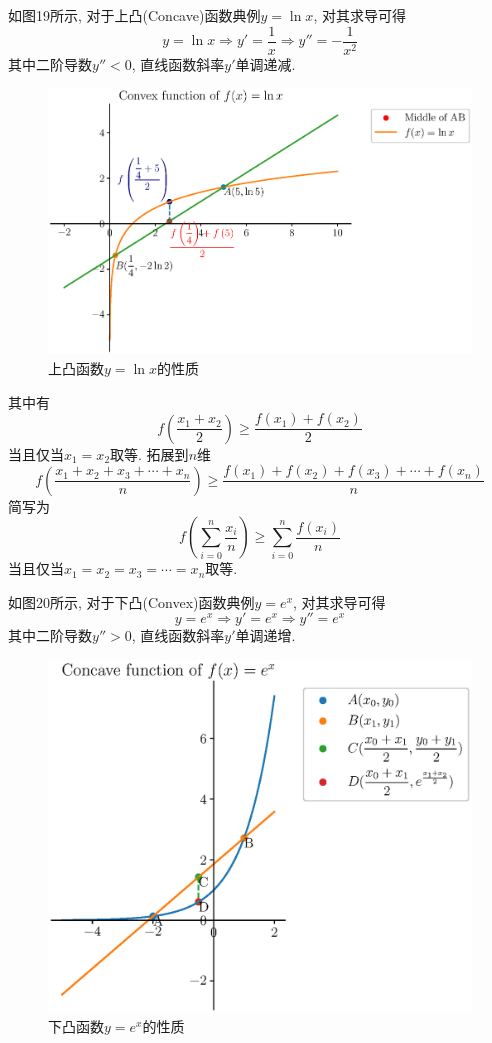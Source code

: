 \documentclass{book}
\begin{document}
    如图19所示, 对于上凸(Concave)函数典例$y=\ln x$, 对其求导可得$$y=\ln x\Longrightarrow y'=\frac{1}{x}\Longrightarrow y''=-\frac{1}{x^2}$$其中二阶导数$y''<0$, 直线函数斜率$y'$单调递减.

    \begin{figure}[htbp]
        \centering
        \includegraphics[width=\textwidth]{img/ConvexFunctionIntro.eps}
        \caption{上凸函数$\displaystyle y=\ln x$的性质}
    \end{figure}

    其中有$$f\left( \frac{x_1+x_2}{2} \right)\ge \frac{f\left( x_1 \right)+f\left( x_2 \right)}{2}$$当且仅当$x_1=x_2$取等. 拓展到$n$维$$f\left( \frac{x_1+x_2+x_3+\cdots+x_n}{n} \right)\ge \frac{f(x_1)+f(x_2)+f(x_3)+\cdots+f(x_n)}{n}$$简写为$$f\left( \sum_{i=0}^{n}\frac{x_i }{n} \right)\ge \sum_{i=0}^{n}\frac{f(x_i) }{n}$$当且仅当$x_1=x_2=x_3=\cdots=x_n$取等.

    如图20所示, 对于下凸(Convex)函数典例$y=e^x$, 对其求导可得$$y=e^x\Longrightarrow y'=e^x\Longrightarrow y''=e^x$$其中二阶导数$y''>0$, 直线函数斜率$y'$单调递增.

    \begin{figure}[htbp] 
        \centering
        \includegraphics[width=\textwidth]{img/ConcaveFunctionIntro.eps}
        \caption{下凸函数$\displaystyle y=e^x$的性质}
    \end{figure}
\end{document}
